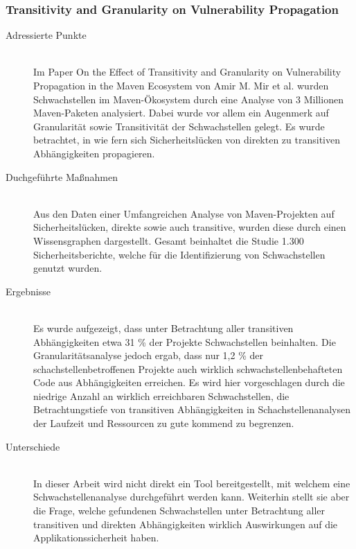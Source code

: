 \subsubsection{Transitivity and Granularity on Vulnerability Propagation} \label{sec:Transitivity}
    \begin{description}
        \item[Adressierte Punkte]\hfill \\
            Im Paper \glqq On the Effect of Transitivity and Granularity on Vulnerability Propagation in the Maven Ecosystem\grqq\cite{article:OnTheEffect10123571} von Amir M. Mir et al. wurden Schwachstellen im Maven-Ökosystem durch eine Analyse von 3 Millionen Maven-Paketen analysiert.
            Dabei wurde vor allem ein Augenmerk auf Granularität sowie Transitivität der Schwachstellen gelegt.
            Es wurde betrachtet, in wie fern sich Sicherheitslücken von direkten zu transitiven Abhängigkeiten propagieren.
        \item[Duchgeführte Maßnahmen]\hfill \\
            Aus den Daten einer Umfangreichen Analyse von Maven-Projekten auf Sicherheitslücken, direkte sowie auch transitive, wurden diese durch einen Wissensgraphen dargestellt.
            Gesamt beinhaltet die Studie 1.300 Sicherheitsberichte, welche für die Identifizierung von Schwachstellen genutzt wurden.
        \item[Ergebnisse]\hfill \\
            Es wurde aufgezeigt, dass unter Betrachtung aller transitiven Abhängigkeiten etwa 31 \% der Projekte Schwachstellen beinhalten.
            Die Granularitätsanalyse jedoch ergab, dass nur 1,2 \% der schachstellenbetroffenen Projekte auch wirklich schwachstellenbehafteten Code aus Abhängigkeiten erreichen.
            Es wird hier vorgeschlagen durch die niedrige Anzahl an wirklich erreichbaren Schwachstellen, die Betrachtungstiefe von transitiven Abhängigkeiten in Schachstellenanalysen der Laufzeit und Ressourcen zu gute kommend zu begrenzen.
        \item[Unterschiede]\hfill \\
            In dieser Arbeit wird nicht direkt ein Tool bereitgestellt, mit welchem eine Schwachstellenanalyse durchgeführt werden kann.
            Weiterhin stellt sie aber die Frage, welche gefundenen Schwachstellen unter Betrachtung aller transitiven und direkten Abhängigkeiten wirklich Auswirkungen auf die Applikationssicherheit haben.
    \end{description}
